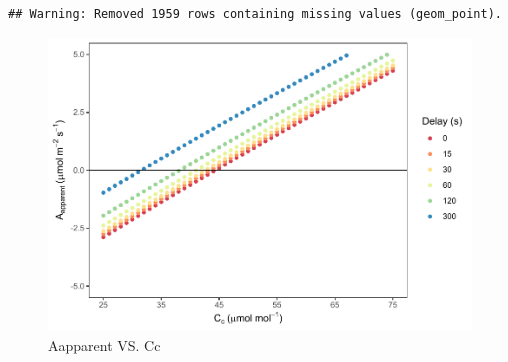 \documentclass[
]{krantz}
\begin{document}
\begin{verbatim}
## Warning: Removed 1959 rows containing missing values (geom_point).
\end{verbatim}

\begin{figure}
\centering
\includegraphics{bookdown_files/figure-latex/aappcc-1.pdf}
\caption{\label{fig:aappcc}Aapparent VS. Cc}
\end{figure}
\end{document}
